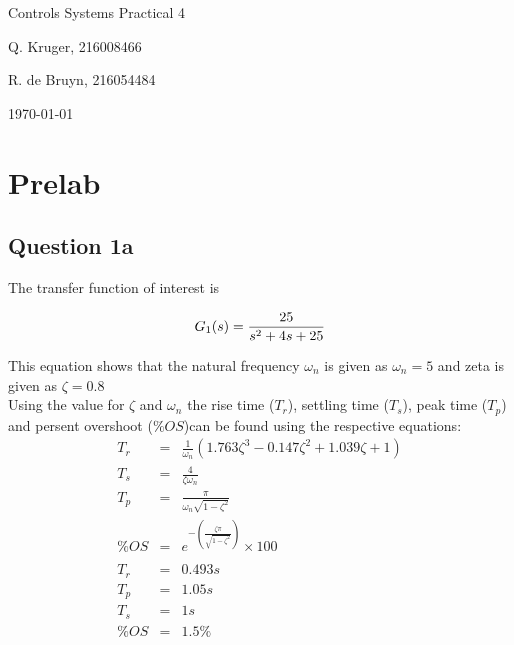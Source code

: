 \documentclass[12pt, a4paper]{article}
\begin{document}
		\begin{titlepage}
			\centering
			{\LARGE Controls Systems Practical 4 \par}
			\vspace*{1.5cm}
			{\large Q. Kruger, 216008466 \par}
			{\large R. de Bruyn, 216054484 \par}
			\vspace*{1.2cm}
			{\large \today}
			\vspace*{\fill}
			\vspace*{\fill}
		\end{titlepage}

		\tableofcontents
		\listoffigures
		\newpage

	\section{Prelab} %
	\label{sec:prelab}
		\subsection{Question 1a} %
		\label{sub:question_1a}
		The transfer function of interest is 

		\begin{equation}
			\label{eqn:G_1}
			G_1(s) =\frac{25}{s^2 +4s+25} \\
		\end{equation}
				
	
		This equation shows that the natural frequency $\omega_n$ is given as $\omega_n = 5$ and zeta is given as $\zeta = 0.8$\\ 

		Using the value for $\zeta$ and $\omega_n$ the rise time ($T_r$), settling time ($T_s$), peak time ($T_p$) and persent overshoot ($\%OS$)can be found using the respective equations:
		\[
			\begin{array}{rcl}

				T_r &=& \frac{1}{\omega_n}(1.763\zeta^3-0.147\zeta^2+1.039\zeta+1)\\
				T_s &=& \frac{4}{\zeta\omega_n}\\
				T_p &=& \frac{\pi}{\omega_n\sqrt{1-\zeta^2}}\\
				\%OS &=& e^{-(\frac{\zeta\pi}{\sqrt{1-\zeta^2}})} \times 100\\
				\\
				T_r &=& 0.493 s \\
				T_p &=& 1.05 s\\
				T_s &=& 1 s\\
				\%OS &=& 1.5 \%\\
			\end{array}
		\]
\end{document}
